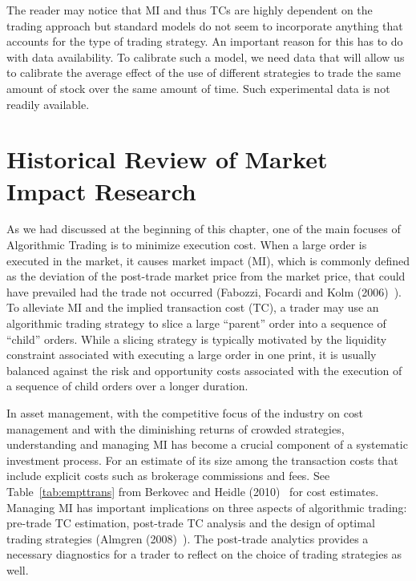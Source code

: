 The reader may notice that MI and thus TCs are highly dependent on the trading approach but standard models do not seem to incorporate anything that accounts for the type of trading strategy. An important reason for this has to do with data availability. To calibrate such a model, we need data that will allow us to calibrate the average effect of the use of different strategies to trade the same amount of stock over the same amount of time. Such experimental data is not readily available. \label{in:transcost2}



\section{Historical Review of Market Impact Research\label{sec:historical_review_mir}}

As we had discussed at the beginning of this chapter, one of the main focuses of Algorithmic Trading is to minimize execution cost. When a large order is executed in the market, it causes market impact (MI), which is commonly defined as the deviation of the post-trade market price from the market price, that could have prevailed had the trade not occurred (Fabozzi, Focardi and Kolm (2006)~\cite{ffk}). To alleviate MI and the implied transaction cost (TC), a trader may use an algorithmic trading strategy to slice a large ``parent'' order into a sequence of ``child'' orders. While a slicing strategy is typically motivated by the liquidity constraint associated with executing a large order in one print, it is usually balanced against the risk and opportunity costs associated with the execution of a sequence of child orders over a longer duration.


In asset management, with the competitive focus of the industry on cost management and with the diminishing returns of crowded strategies, understanding and managing MI has become a crucial component of a systematic investment process. For an estimate of its size among the transaction costs that include explicit costs such as brokerage commissions and fees. See Table~\ref{tab:empttrans} from Berkovec and Heidle (2010)~\cite{borkoheidle} for cost estimates. Managing MI has important implications on three aspects of algorithmic trading: pre-trade TC estimation, post-trade TC analysis and the design of optimal trading strategies (Almgren (2008)~\cite{alm2008}). The post-trade analytics provides a necessary diagnostics for a trader to reflect on the choice of trading strategies as well. 


